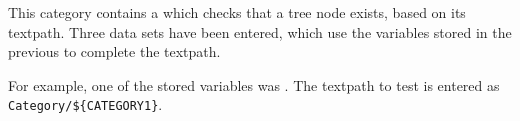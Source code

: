 

This category contains a \gdcase{} which checks that a tree node exists, based on its textpath. Three data sets have been entered, which use the variables stored in the previous \gdcase{} to complete the textpath. 

For example, one of the stored variables was . The textpath to test is entered as \verb+Category/${CATEGORY1}+. 
